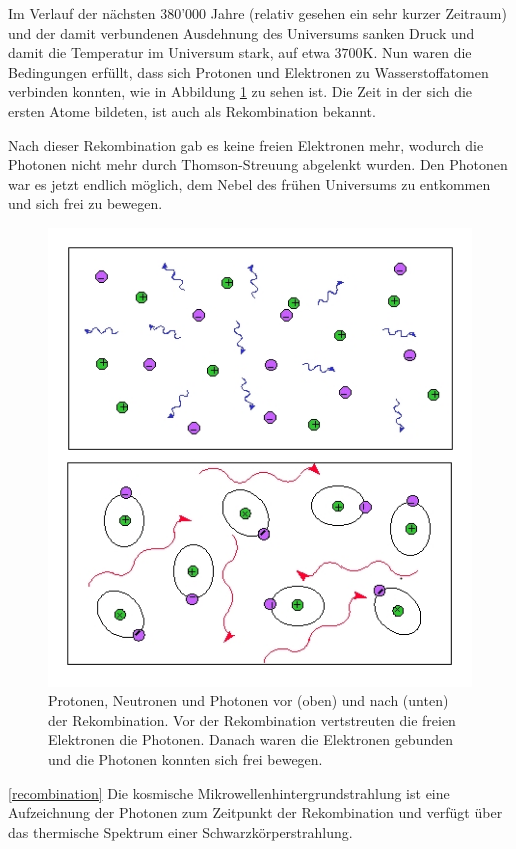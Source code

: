 Im Verlauf der nächsten 380'000 Jahre (relativ gesehen ein sehr kurzer 
Zeitraum) und der damit verbundenen Ausdehnung des Universums sanken Druck und 
damit die Temperatur im Universum stark, auf etwa $3700 \text{K}$.
Nun waren die Bedingungen erfüllt, dass sich Protonen und Elektronen zu 
Wasserstoffatomen verbinden konnten, wie in Abbildung \ref{fig:recombination} 
zu sehen ist. Die Zeit in der sich die ersten Atome bildeten, ist auch als 
Rekombination bekannt.

Nach dieser Rekombination gab es keine freien Elektronen mehr, wodurch die 
Photonen nicht mehr durch Thomson-Streuung abgelenkt wurden.
Den Photonen war es jetzt endlich möglich, dem Nebel des frühen Universums zu 
entkommen und sich frei zu bewegen.
\begin{figure}
	\centering
	\includegraphics[scale=0.5]{cmb/images/recombination.jpg}
	\caption{Protonen, Neutronen und Photonen vor (oben) und nach (unten) der Rekombination. Vor der 
		Rekombination vertstreuten die freien Elektronen die Photonen. Danach waren die Elektronen gebunden
		und die Photonen konnten sich frei bewegen.}
	\label{fig:recombination}
\end{figure}
\ref{recombination}
Die kosmische Mikrowellenhintergrundstrahlung ist eine Aufzeichnung der Photonen zum 
Zeitpunkt der Rekombination und verfügt über das thermische Spektrum einer Schwarzkörperstrahlung.

